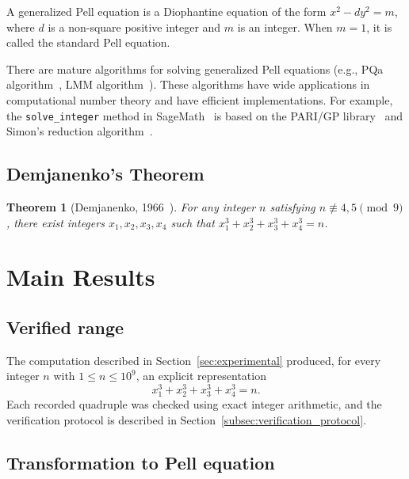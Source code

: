 \documentclass{mcom-l}
\newtheorem{theorem}{Theorem}[section]
\theoremstyle{definition}
\theoremstyle{remark}
\numberwithin{equation}{section}
\begin{document}
A generalized Pell equation is a Diophantine equation of the form
$x^2 - dy^2 = m$, where $d$ is a non-square positive integer and $m$ is an
integer. When $m=1$, it is called the standard Pell equation.

There are mature algorithms for solving generalized Pell equations (e.g.,
PQa algorithm~\cite{Robertson2004}, LMM algorithm~\cite{Matthews2000}).
These algorithms have wide applications in computational number theory and
have efficient implementations. For example, the \texttt{solve\_integer}
method in SageMath~\cite{SageMath2023} is based on the PARI/GP
library~\cite{PARI2024} and Simon's reduction
algorithm~\cite{Simon2005}.

\subsection{Demjanenko's Theorem}
\label{subsec:demjanenko_theorem}

\begin{theorem}[Demjanenko, 1966~\cite{Demjanenko1966}]
\label{thm:demjanenko}
For any integer $n$ satisfying $n \not\equiv 4,5 \pmod{9}$, there exist integers $x_1,x_2,x_3,x_4$ such that $x_1^3 + x_2^3 + x_3^3 + x_4^3 = n$.
\end{theorem}

\section{Main Results}
\label{sec:main_results}

\subsection{Verified range}
\label{subsec:verified_range}

The computation described in Section~\ref{sec:experimental} produced, for
every integer $n$ with $1\leq n\leq 10^9$, an explicit representation
\[
        x_1^3+x_2^3+x_3^3+x_4^3=n.
\]
Each recorded quadruple was checked using exact integer arithmetic, and the
verification protocol is described in Section~\ref{subsec:verification_protocol}.

\subsection{Transformation to Pell equation}
\label{subsec:transformation}
\end{document}
